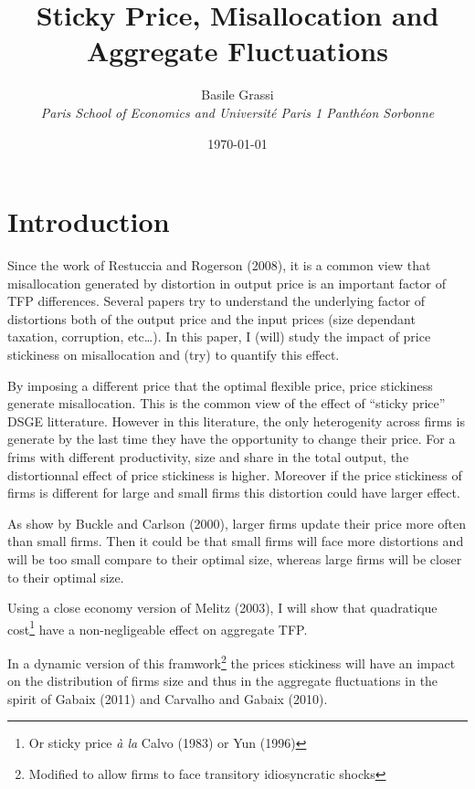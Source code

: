 \documentclass[12pt]{article}
\title{Sticky Price, Misallocation and Aggregate Fluctuations}
\author{Basile Grassi\\
\small{\emph{Paris School of Economics and Université Paris 1 Panthéon Sorbonne}}
}
\date{\today}
\begin{document}
\maketitle



\section{Introduction}
Since the work of Restuccia and Rogerson (2008), it is a common view that misallocation generated by distortion in output price is an important factor of TFP differences. Several papers try to understand the underlying factor of distortions both of the output price and the input prices (size dependant taxation, corruption, etc\ldots). In this paper, I (will) study the impact of price stickiness on misallocation and (try) to quantify this effect. 

By imposing a different price that the optimal flexible price, price stickiness generate misallocation. This is the common view of the effect of ``sticky price'' DSGE litterature. However in this literature, the only heterogenity across firms is generate by the last time they have the opportunity to change their price. For a frims with different productivity, size and share in the total output, the distortionnal effect of price stickiness is higher. Moreover  if the price stickiness of firms is different for large and small firms this distortion could have larger effect. 

As show by Buckle and Carlson (2000)\nocite{Buck00}, larger firms update their price more often than small firms. Then it could be that small firms will face more distortions and will be too small compare to their optimal size, whereas large firms will be closer to their optimal size.

Using a close economy version of Melitz (2003)\nocite{Meli03}, I will show that quadratique cost\footnote{Or sticky price \emph{\`a la} Calvo (1983)\nocite{Calv83} or Yun (1996)\nocite{Yun96}} have a non-negligeable effect on aggregate TFP. 

In a dynamic version of this framwork\footnote{Modified to allow firms to face transitory idiosyncratic shocks} the prices stickiness will have an impact on the distribution of firms size and thus in the aggregate fluctuations in the spirit of Gabaix (2011)\nocite{Gaba11} and Carvalho and Gabaix (2010)\nocite{Carv10}.




\end{document}
